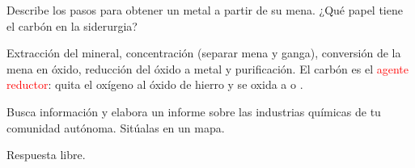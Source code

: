 \begin{exercise}
    Describe los pasos para obtener un metal a partir de su mena. ¿Qué papel tiene el carbón en la siderurgia?
    \begin{solu}
        Extracción del mineral, concentración (separar mena y ganga), conversión de la mena en óxido, reducción del óxido a metal y purificación. El carbón es el \textcolor{red}{agente reductor}: quita el oxígeno al óxido de hierro y se oxida a  o .
    \end{solu}
\end{exercise}

\begin{exercise}
    Busca información y elabora un informe sobre las industrias químicas de tu comunidad autónoma. Sitúalas en un mapa.
    \begin{solu}
        Respuesta libre.
    \end{solu}
\end{exercise}
